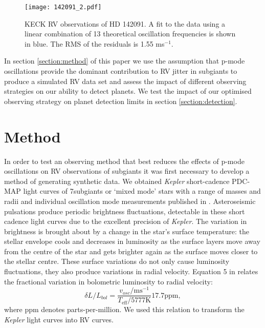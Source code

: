 \documentclass[useAMS, usenatbib]{aastex}
\newcommand{\nsubs}{7}
\begin{document}
\begin{figure*}
\begin{center}
\texttt{[image: 142091\_2.pdf]}
\caption{KECK RV observations of HD 142091. A fit to the data using a linear
combination of 13 theoretical oscillation frequencies is shown in blue. The RMS
of the residuals is 1.55 ms$^{-1}$.}
\label{fig:k2_2}
\end{center}
\end{figure*}

In section \textsection \ref{section:method} of this paper we use the
assumption that p-mode oscillations provide the dominant contribution to RV
jitter in subgiants to produce a simulated RV data set and assess the impact
of different observing strategies on our ability to detect planets.
We test the impact of our optimised observing strategy on planet detection
limits in section \textsection \ref{section:detection}.


\section{Method}
\label{method}

In order to test an observing method that best reduces the effects of p-mode
oscillations on RV observations of subgiants it was first necessary to develop
a method of generating synthetic data.
We obtained {\it Kepler} short-cadence PDC-MAP light curves
\citep[][]{Smith2012, Stumpe2012} of \nsubs subgiants or `mixed mode' stars
with a range of masses and radii and individual oscillation mode measurements
published in \citet{Appourchaux2012}.
Asteroseismic pulsations produce periodic brightness fluctuations, detectable
in these short cadence light curves due to the excellent precision of
{\it Kepler}.
The variation in brightness is brought about by a change in the star's surface
temperature: the stellar envelope cools and decreases in luminosity as the
surface layers move away from the centre of the star and gets brighter again
as the surface moves closer to the stellar centre.
These surface variations do not only cause luminosity fluctuations, they also
produce variations in radial velocity.
Equation 5 in \citet{Kjeldsen1995} relates the fractional variation in
bolometric luminosity to radial velocity:
\begin{equation}
	\delta L/L_{bol} = \frac{v_{osc}/\mathrm{ms}^{-1}}
	{T_{\mathrm{eff}}/5777\mathrm{K}}17.7\mathrm{ppm},
\end{equation}
where ppm denotes parts-per-million.
We used this relation to transform the {\it Kepler} light curves into RV
curves.
\end{document}
